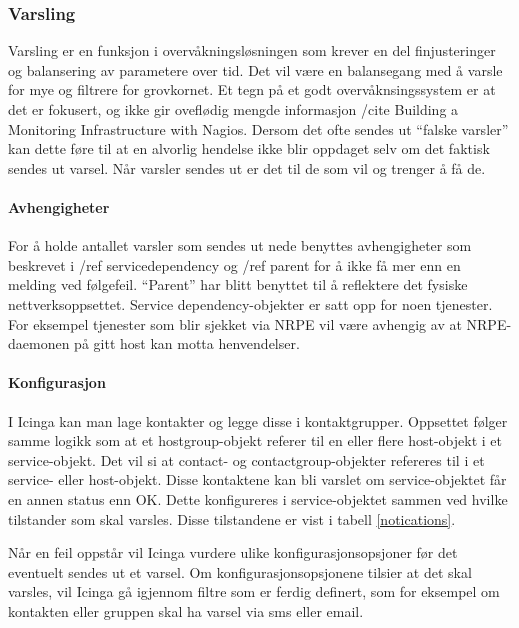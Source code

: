 \subsubsection{Varsling}

Varsling er en funksjon i overvåkningsløsningen som krever en del finjusteringer og balansering av parametere over tid. Det vil være en balansegang med å varsle for mye og filtrere for grovkornet. Et tegn på et godt overvåknsingssystem er at det er fokusert, og ikke gir oveflødig mengde informasjon /cite {Building a Monitoring Infrastructure with Nagios}. Dersom det ofte sendes ut “falske varsler” kan dette føre til at en alvorlig hendelse ikke blir oppdaget selv om det faktisk sendes ut varsel. Når varsler sendes ut er det til de som vil og trenger å få de.

\paragraph{Avhengigheter}

For å holde antallet varsler som sendes ut nede benyttes avhengigheter som beskrevet i /ref {servicedependency} og /ref {parent} for å ikke få mer enn en melding ved følgefeil. “Parent” har blitt benyttet til å reflektere det fysiske nettverksoppsettet. Service dependency-objekter er satt opp for noen tjenester. For eksempel tjenester som blir sjekket via NRPE vil være avhengig av at NRPE-daemonen på gitt host kan motta henvendelser.


\paragraph{Konfigurasjon}

I Icinga kan man lage kontakter og legge disse i kontaktgrupper. Oppsettet følger samme logikk som at et hostgroup-objekt referer til en eller flere host-objekt i et service-objekt.
Det vil si at contact- og contactgroup-objekter refereres til i et service- eller host-objekt. Disse kontaktene kan bli varslet om service-objektet får en annen status enn OK. Dette konfigureres i service-objektet sammen ved hvilke tilstander som skal varsles. Disse tilstandene er vist i tabell \ref{notications}.

Når en feil oppstår vil Icinga vurdere ulike konfigurasjonsopsjoner før det eventuelt sendes ut et varsel. Om konfigurasjonsopsjonene tilsier at det skal varsles, vil Icinga gå igjennom filtre som er ferdig definert, som for eksempel om kontakten eller gruppen skal ha varsel via sms eller email. 

